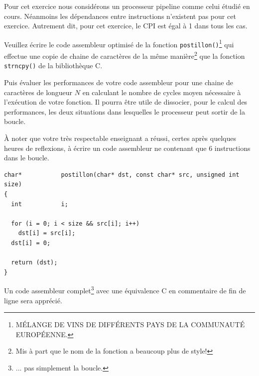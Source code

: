 Pour cet exercice nous consid\'erons un processeur pipeline comme celui
\'etudi\'e en cours. N\'eanmoins les d\'ependances entre instructions
n'existent pas pour cet exercice. Autrement dit, pour cet exercice,
le CPI est \'egal \`a 1 dans tous les cas.

Veuillez \'ecrire le code assembleur optimis\'e de la fonction
\texttt{postillon()}\footnote{M\'ELANGE DE VINS DE DIFF\'ERENTS
                     PAYS DE LA COMMUNAUT\'E EUROP\'EENNE.}
qui effectue une copie de chaine de caract\`eres de la m\^eme
mani\`ere\footnote{Mis \`a part que le nom de la fonction a
                   beaucoup plus de style!}
que la fonction \texttt{strncpy()} de la biblioth\`eque C.

Puis \'evaluer les performances de votre code assembleur pour une chaine
de caract\`eres de longueur $N$ en calculant le nombre de cycles moyen
n\'ecessaire \`a l'ex\'ecution de votre fonction. Il pourra \^etre utile
de dissocier, pour le calcul des performances, les deux situations dans
lesquelles le processeur peut sortir de la boucle.

\`A noter que votre tr\`es respectable enseignant a r\'eussi, certes apr\`es
quelques heures de reflexions, \`a \'ecrire un code assembleur ne contenant que
$6$ instructions dans le boucle.

\begin{verbatim}
char*           postillon(char* dst, const char* src, unsigned int size)
{
  int           i;

  for (i = 0; i < size && src[i]; i++)
    dst[i] = src[i];
  dst[i] = 0;

  return (dst);
}
\end{verbatim}

Un code assembleur complet\footnote{... pas simplement la boucle.} avec une
\'equivalence C en commentaire de fin de ligne sera appr\'eci\'e.

